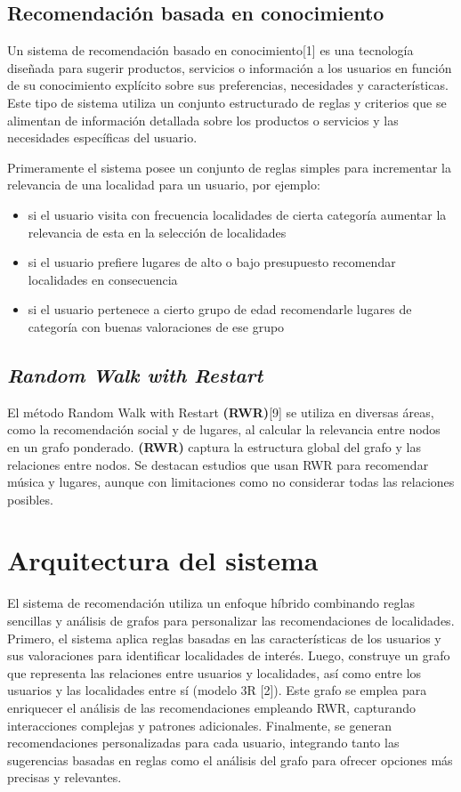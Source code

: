 \documentclass[runningheads]{llncs}
\begin{document}
\subsection{Recomendación basada en conocimiento}

Un sistema de recomendación basado en conocimiento[1] es una tecnología diseñada para sugerir productos, servicios o información a los usuarios en función de su conocimiento explícito sobre sus preferencias, necesidades y características. Este tipo de sistema utiliza un conjunto estructurado de reglas y criterios que se alimentan de información detallada sobre los productos o servicios y las necesidades específicas del usuario. 

Primeramente el sistema posee un conjunto de reglas simples para incrementar la relevancia de una localidad para un usuario, por ejemplo: 

\begin{itemize}[left=1.3em]
    \item si el usuario visita con frecuencia localidades de cierta categoría aumentar la relevancia de esta en la selección de localidades
    \item si el usuario prefiere lugares de alto o bajo presupuesto  recomendar localidades en consecuencia
    \item si el usuario pertenece a cierto grupo de edad recomendarle lugares de categoría con buenas valoraciones de ese grupo
\end{itemize}

\subsection{\textit{Random Walk with Restart}}
El método Random Walk with Restart \textbf{(RWR)}[9] se utiliza en diversas áreas, como la recomendación social y de lugares, al calcular la relevancia entre nodos en un grafo ponderado. \textbf{(RWR)} captura la estructura global del grafo y las relaciones entre nodos. Se destacan estudios que usan RWR para recomendar música y lugares, aunque con limitaciones como no considerar todas las relaciones posibles. 

\section{Arquitectura del sistema}
El sistema de recomendación utiliza un enfoque híbrido combinando reglas sencillas y análisis de grafos para personalizar las recomendaciones de localidades. Primero, el sistema aplica reglas basadas en las características de los usuarios y sus valoraciones para identificar localidades de interés. Luego, construye un grafo que representa las relaciones entre usuarios y localidades, así como entre los usuarios y las localidades entre sí (modelo 3R [2]). Este grafo se emplea para enriquecer el análisis de las recomendaciones empleando RWR, capturando interacciones complejas y patrones adicionales. Finalmente, se generan recomendaciones personalizadas para cada usuario, integrando tanto las sugerencias basadas en reglas como el análisis del grafo para ofrecer opciones más precisas y relevantes.
\end{document}
